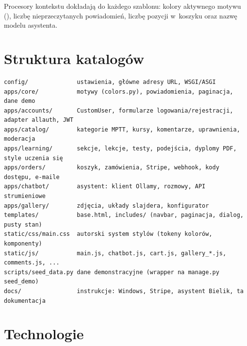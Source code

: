 Procesory kontekstu dokładają do każdego szablonu: kolory aktywnego motywu
(), liczbę nieprzeczytanych powiadomień, liczbę pozycji w~koszyku
oraz nazwę modelu asystenta.

\section{Struktura katalogów}

\begin{lstlisting}
config/              ustawienia, główne adresy URL, WSGI/ASGI
apps/core/           motywy (colors.py), powiadomienia, paginacja, dane demo
apps/accounts/       CustomUser, formularze logowania/rejestracji, adapter allauth, JWT
apps/catalog/        kategorie MPTT, kursy, komentarze, uprawnienia, moderacja
apps/learning/       sekcje, lekcje, testy, podejścia, dyplomy PDF, style uczenia się
apps/orders/         koszyk, zamówienia, Stripe, webhook, kody dostępu, e-maile
apps/chatbot/        asystent: klient Ollamy, rozmowy, API strumieniowe
apps/gallery/        zdjęcia, układy slajdera, konfigurator
templates/           base.html, includes/ (navbar, paginacja, dialog, pusty stan)
static/css/main.css  autorski system stylów (tokeny kolorów, komponenty)
static/js/           main.js, chatbot.js, cart.js, gallery_*.js, comments.js, ...
scripts/seed_data.py dane demonstracyjne (wrapper na manage.py seed_demo)
docs/                instrukcje: Windows, Stripe, asystent Bielik, ta dokumentacja
\end{lstlisting}

\section{Technologie}

